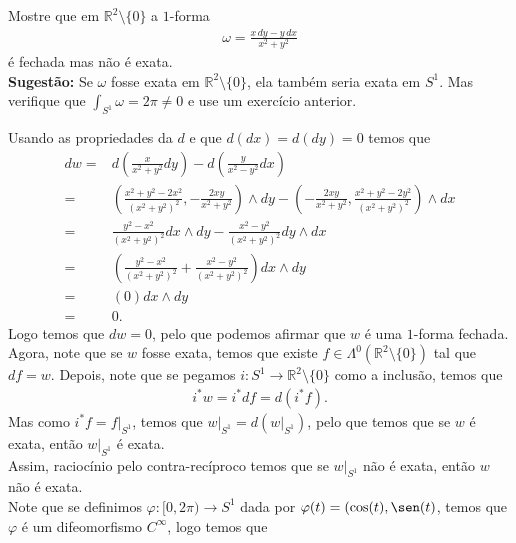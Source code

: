 \begin{homeworkProblem}[Seção 2-7]
  Mostre que em $\mathbb{R}^{2}\setminus\{0\}$ a $1$-forma
  \begin{align*}
    \omega=\frac{x\,dy-y\,dx}{x^{2}+y^{2}}
  \end{align*}
  é fechada mas não é exata.\\
  \textbf{Sugestão:} Se $\omega$ fosse exata em $\mathbb{R}^{2}\setminus\{0\}$, ela também seria exata em $S^{1}$. Mas verifique que $\int_{S^{1}}\omega=2\pi\neq 0$ e use um exercício anterior.
  \begin{solution}
    Usando as propriedades da $d$ e que $d(dx)=d(dy)=0$ temos que 
    \begin{align*}
      dw=&d\left( \frac{x}{x^{2}+y^{2}}dy \right)-d\left( \frac{y}{x^{2}-y^{2}}dx \right)\\
      =&\left( \frac{x^{2}+y^{2}-2x^{2}}{(x^{2}+y^{2})^{2}},-\frac{2xy}{x^{2}+y^{2}} \right)\wedge dy-\left( -\frac{2xy}{x^{2}+y^{2}},\frac{x^{2}+y^{2}-2y^{2}}{(x^{2}+y^{2})^{2}} \right)\wedge dx\\
      =&\frac{y^{2}-x^{2}}{(x^{2}+y^{2})^{2}}dx\wedge dy - \frac{x^{2}-y^{2}}{(x^{2}+y^{2})^{2}}dy\wedge dx\\
      =&\left( \frac{y^{2}-x^{2}}{(x^{2}+y^{2})^{2}}+\frac{x^{2}-y^{2}}{(x^{2}+y^{2})^{2}} \right)dx\wedge dy\\
      =&(0)dx\wedge dy\\
      =&0.
    \end{align*}
    Logo temos que $dw=0$, pelo que podemos afirmar que $w$ é uma $1$-forma fechada.\\
    Agora, note que se $w$ fosse exata, temos que existe $f\in\Lambda^{0}(\mathbb{R}^{2}\setminus\{0\})$ tal que $df=w$. Depois, note que se pegamos $i:S^{1}\to\mathbb{R}^{2}\setminus\{0\}$ como a inclusão, temos que
    \begin{align*}
      i^{\ast}w=i^{\ast}df=d(i^{\ast}f).
    \end{align*}
    Mas como $i^{\ast}f=f\big|_{S^{1}}$, temos que $w\big|_{S^{1}}=d\left( w\big|_{S^1} \right)$, pelo que temos que se $w$ é exata, então $w\big|_{S^{1}}$ é exata.\\
    Assim, raciocínio pelo contra-recíproco temos que se $w\big|_{S^{1}}$ não é exata, então $w$ não é exata.\\
    Note que se definimos $\varphi:[0,2\pi)\to S^{1}$ dada por $\varphi(t)=(\cos(t),\sen(t)$, temos que $\varphi$ é um difeomorfismo $C^{\infty}$, logo temos que
    \begin{align*}

\end{align*}
\end{solution}
\end{homeworkProblem}
